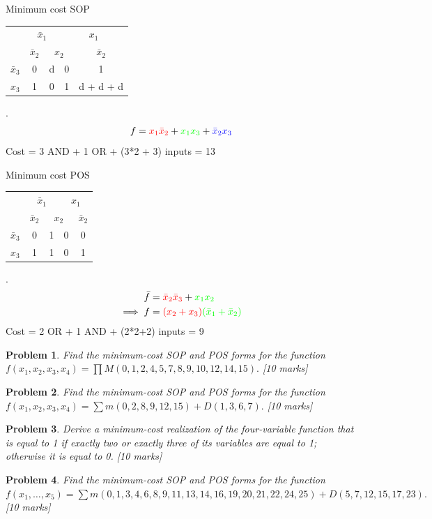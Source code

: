 \documentclass[twocolumn]{article}
\newtheorem{prob}{Problem}
\newcommand{\bx}{\bar{x}}
\newcommand{\cred}{\color{red}}
\newcommand{\cg}{\color{green}}
\newcommand{\cb}{\color{blue}}
\begin{document}
Minimum cost SOP
\\
\begin{tabular}{c|c|c|c|c}
  \toprule
  & \multicolumn{2}{c|}{$\bx_1$} & \multicolumn{2}{c}{$x_1$}
  \\
  & $\bx_2$ & \multicolumn{2}{c|}{$x_2$} & $\bx_2$
  \\ \midrule
  $\bx_3$
                                  & 0 & d & 0 & \cred 1
  \\
  $x_3$
                                  & \cb 1 & 0 & {\cg 1} & {\cg d} + \cred d + \cb d
  \\\bottomrule
\end{tabular}.
\\
\begin{align}
  f = {\cred x_1 \bx_2} + {\cg x_1 x_3} + {\cb \bx_2 x_3}
\end{align}
Cost = 3 AND  + 1 OR + (3*2 + 3) inputs = 13

Minimum cost POS
\\
\begin{tabular}{c|c|c|c|c}
  \toprule
  & \multicolumn{2}{c|}{$\bx_1$} & \multicolumn{2}{c}{$x_1$}
  \\
  & $\bx_2$ & \multicolumn{2}{c|}{$x_2$} & $\bx_2$
  \\ \midrule
  $\bx_3$
  & \cred 0 & 1 & \cg 0 & \cred 0
  \\
  $x_3$
  & 1 & 1 & \cg 0 & 1
  \\\bottomrule
\end{tabular}.
\\
\begin{align}
  \bar{f} &= {\cred \bx_2 \bx_3} + {\cg x_1 x_2 }
  \\
  \implies f &= {\cred (x_2 + x_3)}{\cg (\bx_1 + \bx_2) }
\end{align}
Cost = 2 OR + 1 AND + (2*2+2) inputs = 9

\begin{prob}
Find the minimum-cost SOP and POS forms for the function $f(x_1 , x_2 , x_3,
x_4) = \prod M(0, 1, 2, 4, 5, 7, 8, 9, 10, 12, 14, 15).$ \cite[Prob
2.39]{brown2013fundamentals} [10 marks]
\end{prob}

\begin{prob}
Find the minimum-cost SOP and POS forms for the function $f(x_1 , x_2 , x_3, x_4) =
\sum m(0, 2, 8, 9, 12, 15) + D(1, 3, 6, 7).$ \cite[Prob
2.40]{brown2013fundamentals} [10 marks]
\end{prob}

\begin{prob}
Derive a minimum-cost realization of the four-variable function that is equal to 1 if exactly
two or exactly three of its variables are equal to 1; otherwise it is equal to
0. \cite[Prob 2.46]{brown2013fundamentals} [10 marks]
\end{prob}

\begin{prob}
  Find the minimum-cost SOP and POS forms for the function $f(x_1 , \dots, x_5) =
  \sum m(0, 1, 3, 4, 6, 8, 9, 11, 13, 14, 16, 19, 20, 21, 22, 24, 25) + D(5, 7,
  12, 15, 17, 23).$  \cite[Prob 2.42]{brown2013fundamentals} [10 marks]
\end{prob}



\end{document}
